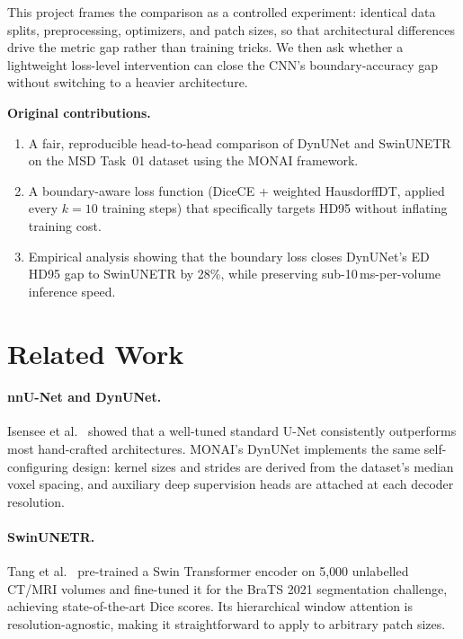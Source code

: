\documentclass[12pt, letterpaper]{article}
\begin{document}
This project frames the comparison as a controlled experiment: identical data
splits, preprocessing, optimizers, and patch sizes, so that architectural
differences drive the metric gap rather than training tricks.
We then ask whether a lightweight loss-level intervention can close the
CNN's boundary-accuracy gap without switching to a heavier architecture.

\textbf{Original contributions.}
\begin{enumerate}[leftmargin=*, label=(\arabic*)]
    \item A fair, reproducible head-to-head comparison of DynUNet and SwinUNETR
          on the MSD Task~01 dataset using the MONAI framework.
    \item A boundary-aware loss function (DiceCE + weighted HausdorffDT,
          applied every $k=10$ training steps) that specifically targets
          HD95 without inflating training cost.
    \item Empirical analysis showing that the boundary loss closes
          DynUNet's ED HD95 gap to SwinUNETR by 28\%, while preserving
          sub-10\,ms-per-volume inference speed.
\end{enumerate}

\section{Related Work}

\paragraph{nnU-Net and DynUNet.}
Isensee et al.\ \cite{isensee2021} showed that a well-tuned standard U-Net
consistently outperforms most hand-crafted architectures.
MONAI's DynUNet implements the same self-configuring design: kernel sizes and
strides are derived from the dataset's median voxel spacing, and auxiliary
deep supervision heads are attached at each decoder resolution.

\paragraph{SwinUNETR.}
Tang et al.\ \cite{tang2022} pre-trained a Swin Transformer encoder on 5{,}000
unlabelled CT/MRI volumes and fine-tuned it for the BraTS 2021 segmentation
challenge, achieving state-of-the-art Dice scores.
Its hierarchical window attention is resolution-agnostic, making it straightforward
to apply to arbitrary patch sizes.
\end{document}
